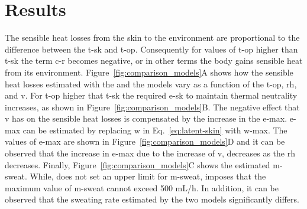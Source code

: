 

\section{Results}\label{sec:results}

The sensible heat losses from the skin to the environment are proportional to the difference between the \ac{t-sk} and \ac{t-op}.
Consequently for values of \ac{t-op} higher than \ac{t-sk} the term \ac{c-r} becomes negative, or in other terms the body gains sensible heat from its environment.
Figure~\ref{fig:comparison_models}A shows how the sensible heat losses estimated with the  and the  models vary as a function of the \ac{t-op}, \ac{rh}, and \ac{v}.
For \ac{t-op} higher that \ac{t-sk} the required \ac{e-sk} to maintain thermal neutrality increases, as shown in Figure~\ref{fig:comparison_models}B.
The negative effect that \ac{v} has on the sensible heat losses is compensated by the increase in the \ac{e-max}.
\ac{e-max} can be estimated by replacing \ac{w} in Eq.~\ref{eq:latent-skin} with \ac{w-max}.
The values of \ac{e-max} are shown in Figure~\ref{fig:comparison_models}D and it can be observed that the increase in \ac{e-max} due to the increase of \ac{v}, decreases as the \ac{rh} decreases.
Finally, Figure~\ref{fig:comparison_models}C shows the estimated \ac{m-sweat}.
While,  does not set an upper limit for \ac{m-sweat},  imposes that the maximum value of \ac{m-sweat} cannot exceed 500 mL/h. %
In addition, it can be observed that the sweating rate estimated by the two models significantly differs.

